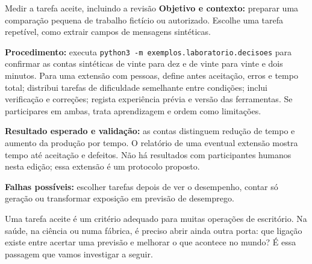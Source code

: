 \begin{promptlabbox}{Medir a tarefa aceite, incluindo a revisão}
\textbf{Objetivo e contexto:} preparar uma comparação pequena de trabalho fictício ou autorizado. Escolhe uma tarefa repetível, como extrair campos de mensagens sintéticas.

\textbf{Procedimento:} executa \texttt{python3 -m exemplos.laboratorio.decisoes} para confirmar as contas sintéticas de vinte para dez e de vinte para vinte e dois minutos. Para uma extensão com pessoas, define antes aceitação, erros e tempo total; distribui tarefas de dificuldade semelhante entre condições; inclui verificação e correções; regista experiência prévia e versão das ferramentas. Se participares em ambas, trata aprendizagem e ordem como limitações.

\textbf{Resultado esperado e validação:} as contas distinguem redução de tempo e aumento da produção por tempo. O relatório de uma eventual extensão mostra tempo até aceitação e defeitos. Não há resultados com participantes humanos nesta edição; essa extensão é um protocolo proposto.

\textbf{Falhas possíveis:} escolher tarefas depois de ver o desempenho, contar só geração ou transformar exposição em previsão de desemprego.
\end{promptlabbox}

Uma tarefa aceite é um critério adequado para muitas operações de escritório. Na saúde, na ciência ou numa fábrica, é preciso abrir ainda outra porta: que ligação existe entre acertar uma previsão e melhorar o que acontece no mundo? É essa passagem que vamos investigar a seguir.
